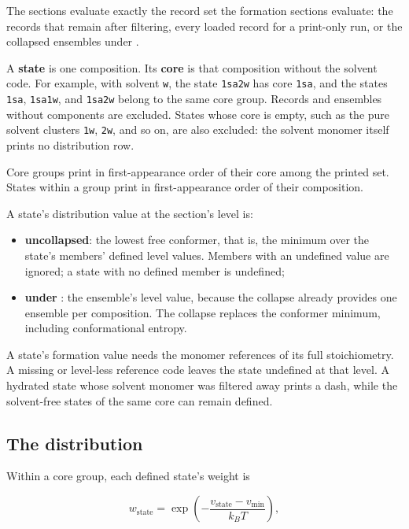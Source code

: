 The sections evaluate exactly the record set the formation sections evaluate:
the records that remain after filtering, every loaded record for a print-only
run, or the collapsed ensembles under .

A \textbf{state} is one composition. Its \textbf{core} is that composition
without the solvent code. For example, with solvent \texttt{w}, the state
\texttt{1sa2w} has core \texttt{1sa}, and the states \texttt{1sa},
\texttt{1sa1w}, and \texttt{1sa2w} belong to the same core group. Records and
ensembles without components are excluded. States whose core is empty, such
as the pure solvent clusters \texttt{1w}, \texttt{2w}, and so on, are also
excluded: the solvent monomer itself prints no distribution row.

Core groups print in first-appearance order of their core among the printed
set. States within a group print in first-appearance order of their
composition.

A state's distribution value at the section's level is:

\begin{itemize}
  \item \textbf{uncollapsed}: the lowest free conformer, that is, the minimum
        over the state's members' defined level values. Members with an
        undefined value are ignored; a state with no defined member is
        undefined;
  \item \textbf{under }: the ensemble's level value, because the
        collapse already provides one ensemble per composition. The
        collapse replaces the conformer minimum, including conformational
        entropy.
\end{itemize}

A state's formation value needs the monomer references of its full
stoichiometry. A missing or level-less reference code leaves the state
undefined at that level. A hydrated state whose solvent monomer was filtered
away prints a dash, while the solvent-free states of the same core can remain
defined.

\subsection{The distribution}\label{sec:distribution}

Within a core group, each defined state's weight is

\begin{equation}
w_{\mathrm{state}} = \exp\!\left(
  -\frac{v_{\mathrm{state}} - v_{\min}}{k_B T}\right),
\end{equation}

